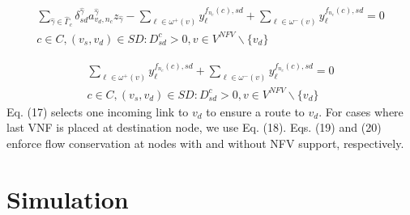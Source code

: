\documentclass[12pt]{article}
\begin{document}
\begin{equation}
\begin{split}
\sum_{\hat{\gamma}\in \hat{\Gamma}_c}\delta_{sd}^{\hat{\gamma}}a_{v_d , n_c}^{\hat{\gamma}}z_{\hat{\gamma}}-\sum_{\ell \in \omega^{+} (v)}y_{\ell}^{f_{n_c} (c),sd}+\sum_{\ell \in \omega^{-} (v)}y_{\ell}^{f_{n_c} (c),sd}=0 \\
 c \in C, (v_s, v_d) \in SD: D_{sd}^{c}>0, v \in V^{NFV} \backslash \{v_d\}
\end{split}
\end{equation}

\begin{equation}
\begin{split}
\sum_{\ell \in \omega^{+} (v)}y_{\ell}^{f_{n_c} (c),sd}+\sum_{\ell \in \omega^{-} (v)}y_{\ell}^{f_{n_c} (c),sd}=0 \\
 c \in C, (v_s, v_d) \in SD: D_{sd}^{c}>0, v \in V^{NFV} \backslash \{v_d\}
\end{split}
\end{equation}
Eq. (17) selects one incoming link to $v_d$ to ensure a route to $v_d$. For cases where last VNF is placed at destination node, we use Eq. (18). Eqs. (19) and (20) enforce flow conservation at nodes with and without NFV support, respectively.
\section{Simulation}
\end{document}
